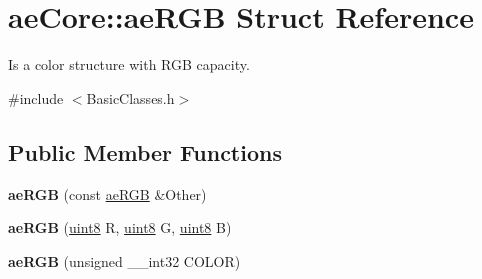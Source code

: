 \hypertarget{structae_core_1_1ae_r_g_b}{}\section{ae\+Core\+:\+:ae\+R\+GB Struct Reference}
\label{structae_core_1_1ae_r_g_b}


Is a color structure with R\+GB capacity.  




{\ttfamily \#include $<$Basic\+Classes.\+h$>$}

\subsection*{Public Member Functions}
\begin{DoxyCompactItemize}
\item 
{\bfseries ae\+R\+GB} (const \hyperlink{structae_core_1_1ae_r_g_b}{ae\+R\+GB} \&Other)\hypertarget{structae_core_1_1ae_r_g_b_acdac34cbf2d4d9fd1ef87580f9f570ee}{}\label{structae_core_1_1ae_r_g_b_acdac34cbf2d4d9fd1ef87580f9f570ee}

\item 
{\bfseries ae\+R\+GB} (\hyperlink{namespaceae_core_aa13093dc911869e5b24942552898f01f}{uint8} R, \hyperlink{namespaceae_core_aa13093dc911869e5b24942552898f01f}{uint8} G, \hyperlink{namespaceae_core_aa13093dc911869e5b24942552898f01f}{uint8} B)\hypertarget{structae_core_1_1ae_r_g_b_a0e17a9e0089139d9d41ac190effeb7d0}{}\label{structae_core_1_1ae_r_g_b_a0e17a9e0089139d9d41ac190effeb7d0}

\item 
{\bfseries ae\+R\+GB} (unsigned \+\_\+\+\_\+int32 C\+O\+L\+OR)\hypertarget{structae_core_1_1ae_r_g_b_aaece8ab7ce759ea24bf945faf4d53665}{}\label{structae_core_1_1ae_r_g_b_aaece8ab7ce759ea24bf945faf4d53665}

\end{DoxyCompactItemize}
